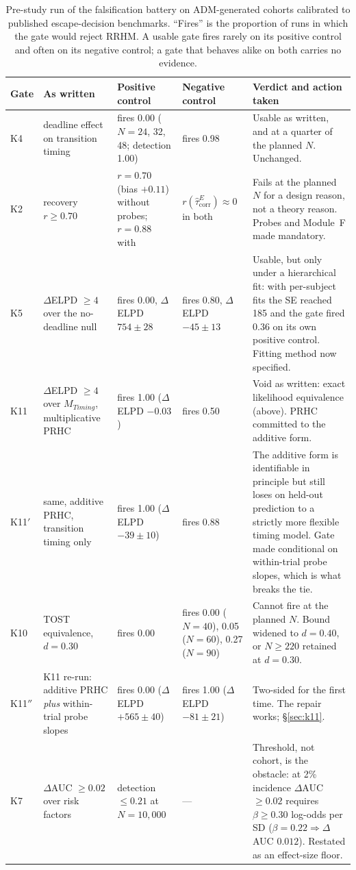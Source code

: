 \documentclass[9pt,twocolumn]{article}
\newcommand{\tcorr}{\widehat{\tau}^{E}_{\mathrm{corr}}}
\begin{document}
\begin{table}[!t]
\centering
\caption{Pre-study run of the falsification battery on ADM-generated cohorts calibrated to published escape-decision benchmarks. ``Fires'' is the proportion of runs in which the gate would reject RRHM. A usable gate fires rarely on its positive control and often on its negative control; a gate that behaves alike on both carries no evidence.}
\label{tab:sim}
\small
\begin{tabularx}{\textwidth}{p{}p{}p{}p{}X}
\toprule
\textbf{Gate} & \textbf{As written} & \textbf{Positive control} & \textbf{Negative control} & \textbf{Verdict and action taken} \\
\midrule
K4 & deadline effect on transition timing & fires 0.00 ($N=24$, 32, 48; detection 1.00) & fires 0.98 & Usable as written, and at a quarter of the planned $N$. Unchanged. \\
K2 & recovery $r\ge0.70$ & $r=0.70$ (bias $+0.11$) without probes; $r=0.88$ with & $r(\tcorr)\approx0$ in both & Fails at the planned $N$ for a design reason, not a theory reason. Probes and Module~F made mandatory. \\
K5 & $\Delta$ELPD $\ge4$ over the no-deadline null & fires 0.00, $\Delta$ELPD $754\pm28$ & fires 0.80, $\Delta$ELPD $-45\pm13$ & Usable, but only under a hierarchical fit: with per-subject fits the SE reached 185 and the gate fired 0.36 on its own positive control. Fitting method now specified. \\
K11 & $\Delta$ELPD $\ge4$ over $M_{Timing}$, multiplicative PRHC & fires 1.00 ($\Delta$ELPD $-0.03$) & fires 0.50 & Void as written: exact likelihood equivalence (above). PRHC committed to the additive form. \\
K11$'$ & same, additive PRHC, transition timing only & fires 1.00 ($\Delta$ELPD $-39\pm10$) & fires 0.88 & The additive form is identifiable in principle but still loses on held-out prediction to a strictly more flexible timing model. Gate made conditional on within-trial probe slopes, which is what breaks the tie. \\
K10 & TOST equivalence, $d=0.30$ & fires 0.00 & fires 0.00 ($N=40$), 0.05 ($N=60$), 0.27 ($N=90$) & Cannot fire at the planned $N$. Bound widened to $d=0.40$, or $N\ge220$ retained at $d=0.30$. \\
K11$''$ & K11 re-run: additive PRHC \emph{plus} within-trial probe slopes & fires 0.00 ($\Delta$ELPD $+565\pm40$) & fires 1.00 ($\Delta$ELPD $-81\pm21$) & Two-sided for the first time. The repair works; \S\ref{sec:k11}. \\
K7 & $\Delta$AUC $\ge0.02$ over risk factors & detection $\le0.21$ at $N=10{,}000$ & --- & Threshold, not cohort, is the obstacle: at 2\% incidence $\Delta$AUC $\ge0.02$ requires $\beta\ge0.30$ log-odds per SD ($\beta=0.22\Rightarrow\Delta$AUC $0.012$). Restated as an effect-size floor. \\
\bottomrule
\end{tabularx}
\end{table}
\end{document}
